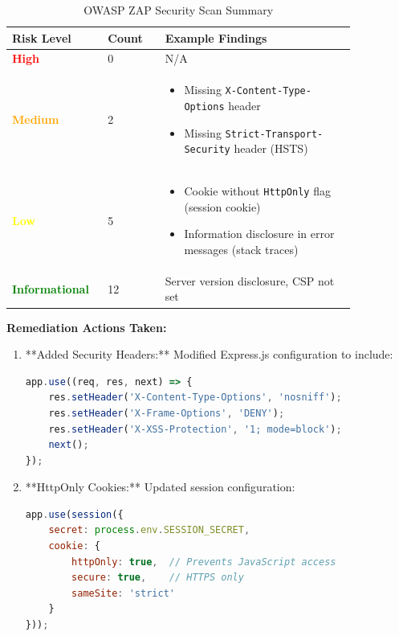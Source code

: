 \begin{table}[H]
\centering
\caption{OWASP ZAP Security Scan Summary}
\label{tab:zap_scan}
\begin{tabular}{@{}p{0.20\linewidth}p{0.15\linewidth}p{0.50\linewidth}@{}}
\toprule
\textbf{Risk Level} & \textbf{Count} & \textbf{Example Findings} \\
\midrule
\textcolor{red}{\textbf{High}} & 0 & N/A \\
\textcolor{orange}{\textbf{Medium}} & 2 & 
\begin{minipage}[t]{\linewidth}
\begin{itemize}[nosep,leftmargin=*]
    \item Missing \texttt{X-Content-Type-Options} header
    \item Missing \texttt{Strict-Transport-Security} header (HSTS)
\end{itemize}
\end{minipage} \\
\textcolor{yellow}{\textbf{Low}} & 5 & 
\begin{minipage}[t]{\linewidth}
\begin{itemize}[nosep,leftmargin=*]
    \item Cookie without \texttt{HttpOnly} flag (session cookie)
    \item Information disclosure in error messages (stack traces)
\end{itemize}
\end{minipage} \\
\textcolor{green}{\textbf{Informational}} & 12 & Server version disclosure, CSP not set \\
\bottomrule
\end{tabular}
\end{table}

\textbf{Remediation Actions Taken:}

\begin{enumerate}
    \item **Added Security Headers:** Modified Express.js configuration to include:
    \begin{lstlisting}[language=JavaScript]
app.use((req, res, next) => {
    res.setHeader('X-Content-Type-Options', 'nosniff');
    res.setHeader('X-Frame-Options', 'DENY');
    res.setHeader('X-XSS-Protection', '1; mode=block');
    next();
});
    \end{lstlisting}
    
    \item **HttpOnly Cookies:** Updated session configuration:
    \begin{lstlisting}[language=JavaScript]
app.use(session({
    secret: process.env.SESSION_SECRET,
    cookie: { 
        httpOnly: true,  // Prevents JavaScript access
        secure: true,    // HTTPS only
        sameSite: 'strict' 
    }
}));
    \end{lstlisting}
\end{enumerate}

